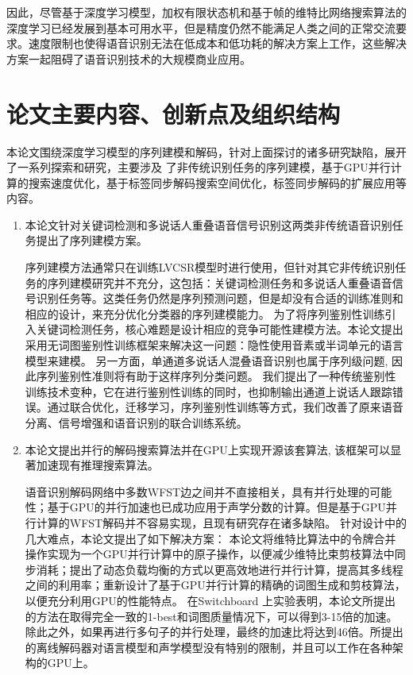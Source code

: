 因此，尽管基于深度学习模型，加权有限状态机和基于帧的维特比网络搜索算法的深度学习已经发展到基本可用水平，但是精度仍然不能满足人类之间的正常交流要求。速度限制也使得语音识别无法在低成本和低功耗的解决方案上工作，这些解决方案一起阻碍了语音识别技术的大规模商业应用。


\section{论文主要内容、创新点及组织结构}
\label{chap:intro0-thesis}


本论文围绕深度学习模型的序列建模和解码，针对上面探讨的诸多研究缺陷，展开了一系列探索和研究，主要涉及
了非传统识别任务的序列建模，基于GPU并行计算的搜索速度优化，基于标签同步解码搜索空间优化，标签同步解码的扩展应用等内容。

\begin{enumerate}
\item 本论文针对关键词检测和多说话人重叠语音信号识别这两类非传统语音识别任务提出了序列建模方案。

序列建模方法通常只在训练LVCSR模型时进行使用，但针对其它非传统识别任务的序列建模研究并不充分，这包括：关键词检测任务和多说话人重叠语音信号识别任务等。这类任务仍然是序列预测问题，但是却没有合适的训练准则和相应的设计，来充分优化分类器的序列建模能力。
为了将序列鉴别性训练引入关键词检测任务，核心难题是设计相应的竞争可能性建模方法。本论文提出采用无词图鉴别性训练框架来解决这一问题：隐性使用音素或半词单元的语言模型来建模。
另一方面，单通道多说话人混叠语音识别也属于序列级问题, 因此序列鉴别性准则将有助于这样序列分类问题。
我们提出了一种传统鉴别性训练技术变种，它在进行鉴别性训练的同时，也抑制输出通道上说话人跟踪错误。通过联合优化，迁移学习，序列鉴别性训练等方式，我们改善了原来语音分离、信号增强和语音识别的联合训练系统。

    \item 
本论文提出并行的解码搜索算法并在GPU上实现开源该套算法, 该框架可以显著加速现有推理搜索算法。

语音识别解码网络中多数WFST边之间并不直接相关，具有并行处理的可能性；基于GPU的并行加速也已成功应用于声学分数的计算。但是基于GPU并行计算的WFST解码并不容易实现，且现有研究存在诸多缺陷。
针对设计中的几大难点，本论文提出了如下解决方案：
本论文将维特比算法中的令牌合并操作实现为一个GPU并行计算中的原子操作，以便减少维特比束剪枝算法中同步消耗；提出了动态负载均衡的方式以更高效地进行并行计算，提高其多线程之间的利用率；重新设计了基于GPU并行计算的精确的词图生成和剪枝算法，以便充分利用GPU的性能特点。
%
在Switchboard 上实验表明，本论文所提出的方法在取得完全一致的1-best和词图质量情况下，可以得到3-15倍的加速。除此之外，如果再进行多句子的并行处理，最终的加速比将达到46倍。所提出的离线解码器对语言模型和声学模型没有特别的限制，并且可以工作在各种架构的GPU上。



\end{enumerate}
